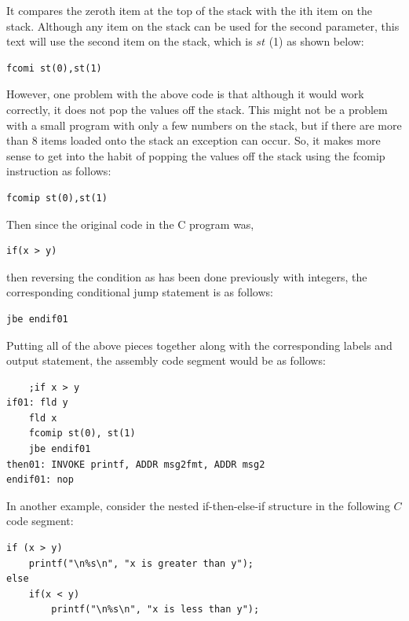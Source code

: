\documentclass[10pt]{book}
\begin{document}
\begin{center}
\begin{center}
\begin{center}
\begin{center}
It compares the zeroth item at the top of the stack with the ith item on the stack. Although any item on the stack can be used for the second parameter, this text will use the second item on the stack, which is $s t$ (1) as shown below:

\begin{verbatim}
fcomi st(0),st(1)
\end{verbatim}

However, one problem with the above code is that although it would work correctly, it does not pop the values off the stack. This might not be a problem with a small program with only a few numbers on the stack, but if there are more than 8 items loaded onto the stack an exception can occur. So, it makes more sense to get into the habit of popping the values off the stack using the fcomip instruction as follows:


\begin{verbatim}
fcomip st(0),st(1)
\end{verbatim}

Then since the original code in the C program was,

\begin{verbatim}
if(x > y)
\end{verbatim}

then reversing the condition as has been done previously with integers, the corresponding conditional jump statement is as follows:

\begin{verbatim}
jbe endif01
\end{verbatim}

Putting all of the above pieces together along with the corresponding labels and output statement, the assembly code segment would be as follows:

\begin{verbatim}
    ;if x > y
if01: fld y
    fld x
    fcomip st(0), st(1)
    jbe endif01
then01: INVOKE printf, ADDR msg2fmt, ADDR msg2
endif01: nop
\end{verbatim}

In another example, consider the nested if-then-else-if structure in the following $C$ code segment:

\begin{verbatim}
if (x > y)
    printf("\n%s\n", "x is greater than y");
else
    if(x < y)
        printf("\n%s\n", "x is less than y");
\end{verbatim}


\end{center}
\end{center}
\end{center}
\end{center}
\end{document}

